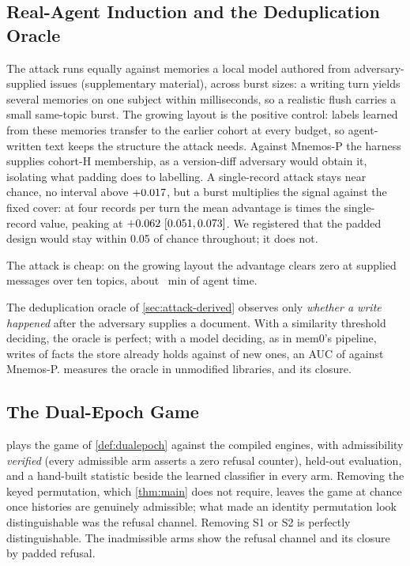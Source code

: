 \subsection{Real-Agent Induction and the Deduplication Oracle}
\label{sec:eval-induction}
\label{sec:eval-dedup}

The attack runs equally against memories a local model authored from adversary-supplied
issues (supplementary material), across burst sizes: a writing turn yields several memories on one subject within
milliseconds, so a realistic flush carries a small same-topic burst. The growing layout is the
positive control: labels learned from these memories transfer to the earlier cohort at every budget,
so agent-written text keeps the structure the attack needs. Against Mnemos-P the harness supplies
cohort-H membership, as a version-diff adversary would obtain it, isolating what padding does to
labelling. A single-record attack stays near chance, no interval above $+0.017$, but a
burst multiplies the signal against the fixed cover: at four records per turn the mean advantage is
\REtwoBurstRatio{} times the single-record value, peaking at $+0.062~[0.051, 0.073]$. We registered that
the padded design would stay within 0.05 of chance throughout; it does not.

The attack is cheap: on the growing layout the advantage clears zero at
\REtwentyeightGrowOneMsgs{} supplied messages over ten topics, about \REtwentyeightGrowOneMin~min of
agent time.

The deduplication oracle of \cref{sec:attack-derived} observes only \emph{whether a write happened}
after the adversary supplies a document. With a similarity threshold deciding, the oracle is
perfect; with a model deciding, as in mem0's pipeline, \texttt{\REthreeModel} writes
\REthreeLlmWriteMember{} of facts the store already holds against \REthreeLlmWriteNonmember{} of new
ones, an AUC of \REthreePLlmAUC{} against Mnemos-P.  measures the oracle in
unmodified libraries, and its closure.

\subsection{The Dual-Epoch Game}
\label{sec:eval-game}



 plays the game of \cref{def:dualepoch} against the compiled engines, with
admissibility \emph{verified} (every admissible arm asserts a zero refusal counter), held-out
evaluation, and a hand-built statistic beside the learned classifier in every arm. Removing the
keyed permutation, which \cref{thm:main} does not require, leaves the game at chance once histories
are genuinely admissible; what made an identity permutation look distinguishable was the refusal
channel. Removing S1 or S2 is perfectly distinguishable. The inadmissible arms show the refusal
channel and its closure by padded refusal.

